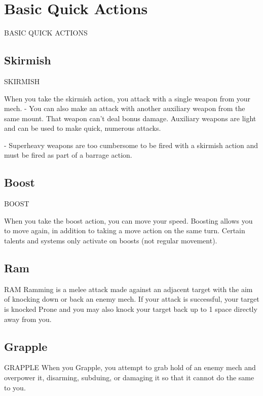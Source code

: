 \section{Basic Quick Actions}

                       BASIC QUICK ACTIONS  
\subsection{Skirmish}

                                             SKIRMISH  

When you take the skirmish action, you attack with a single weapon from your mech.   
        - You can also make an attack with another auxiliary weapon from the same mount. That  
        weapon can’t deal bonus damage. Auxiliary weapons are light and can be used to make  
        quick, numerous attacks.
 
        	- Superheavy weapons are too cumbersome to be fired with a skirmish action and must  
        be fired as part of a barrage action.
 
\subsection{Boost}

                                                BOOST  

When you take the boost action, you can move your speed. Boosting allows you to move again,  
in addition to taking a move action on the same turn. Certain talents and systems only activate  
on boosts (not regular movement).
 
\subsection{Ram}

                                                 RAM  
Ramming is a melee attack made against an adjacent target with the aim of knocking down or  
back an enemy mech.   
If your attack is successful, your target is knocked Prone and you may also knock your target  
back up to 1 space directly away from you.  
\subsection{Grapple}

                                              GRAPPLE  
When you Grapple, you attempt to grab hold of an enemy mech and overpower it, disarming,  
subduing, or damaging it so that it cannot do the same to you.   

